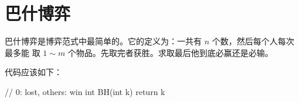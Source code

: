 \section{巴什博弈} \label{sec:巴什博弈}
巴什博弈是博弈范式中最简单的。它的定义为：一共有 $n$ 个数，然后每个人每次最多能
取 $1 \sim m$ 个物品。先取完者获胜。求取最后他到底必赢还是必输。

代码应该如下：
\begin{Cpp}
// 0: lost, others: win
int BH(int k){
    return k %
}
\end{Cpp}


